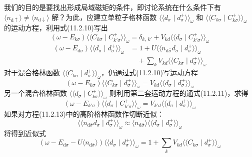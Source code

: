 我们的目的是要找出形成局域磁矩的条件，即讨论系统在什么条件下有 $\langle n_{\mathrm{d}\uparrow}\rangle\neq\langle n_{\mathrm{d}\downarrow}\rangle$ 解？为此，应建立单粒子格林函数 $\langle\langle d_{\sigma}\mid d^{+}_{\sigma}\rangle\rangle_{\omega}$ 和 $\langle\langle C_{k\sigma}\mid C^{+}_{k\sigma}\rangle\rangle_{\omega}$ 的运动方程，利用式(11.2.10)写出
\begin{equation}
  (\omega-E_{k\sigma})
  \langle\langle C_{k\sigma}\mid C^{+}_{k'\sigma}\rangle\rangle_{\omega}
  =\delta_{k,\,k'}
  +V_{kd}\langle\langle d_{\sigma}\mid C^{+}_{k'\sigma}\rangle\rangle_{\omega}
\end{equation}
\begin{equation}
\begin{aligned}
  (\omega-E_{\mathrm{d}\sigma})
  \langle\langle d_{\sigma}\mid d^{+}_{\sigma}\rangle\rangle_{\omega}
  &=1+U\langle\langle n_{\mathrm{d}\bar{\sigma}}d_{\sigma}
  \mid d^{+}_{\sigma}\rangle\rangle_{\omega}\\
  &\quad+\sum_{k}V_{kd}
  \langle\langle C_{k\sigma}\mid d^{+}_{\sigma}\rangle\rangle_{\omega}
\end{aligned}
\end{equation}
对于混合格林函数 $\langle\langle C_{k\sigma}\mid d^{+}_{\sigma}\rangle\rangle_{\omega}$，仍通过式(11.2.10)写运动方程
\begin{equation}
  (\omega-E_{k\sigma})
  \langle\langle C_{k\sigma}\mid d^{+}_{\sigma}\rangle\rangle_{\omega}
  =V_{kd}\langle\langle d_{\sigma}\mid d^{+}_{\sigma}\rangle\rangle_{\omega}
\end{equation}
另一个混合格林函数 $\langle\langle d_{\sigma}\mid C^{+}_{k\sigma}\rangle\rangle_{\omega}$ 则利用第二套运动方程的通式(11.2.11)，求得
\begin{equation}
  (\omega-E_{k'\sigma})
  \langle\langle d_{\sigma}\mid C^{+}_{k'\sigma}\rangle\rangle_{\omega}
  =V_{k'd}\langle\langle d_{\sigma}\mid d^{+}_{\sigma}\rangle\rangle_{\omega}
\end{equation}
如果对方程(11.2.13)中的高阶格林函数作切断近似：
\begin{equation}
  \langle\langle n_{\mathrm{d}\bar{\sigma}}d_{\sigma}\mid d^{+}_{\sigma}\rangle\rangle_{\omega}
  \approx\langle n_{\mathrm{d}\bar{\sigma}}\rangle
  \langle\langle d_{\sigma}\mid d^{+}_{\sigma}\rangle\rangle_{\omega}
\end{equation}
将得到近似式
\begin{equation}
  (\omega-E_{\mathrm{d}\sigma}-U\langle n_{\mathrm{d}\bar{\sigma}}\rangle)
  \langle\langle d_{\sigma}\mid d^{+}_{\sigma}\rangle\rangle_{\omega}
  =1+\sum_{k}V_{kd}
  \langle\langle C_{k\sigma}\mid d^{+}_{\sigma}\rangle\rangle_{\omega}
\end{equation}
